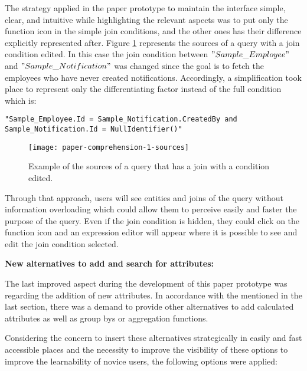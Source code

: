 The strategy applied in the paper prototype to maintain the interface simple, clear, and intuitive while highlighting the relevant aspects was to put only the function icon in the simple join conditions, and the other ones has their difference explicitly represented after. Figure \ref{fig:paperComprehension1Sources} represents the sources of a query with a join condition edited. In this case the join condition between $"Sample\_Employee"$ and $"Sample\_Notification"$ was changed since the goal is to fetch the employees who have never created notifications. Accordingly, a simplification took place to represent only the differentiating factor instead of the full condition which is:

\begin{center}
  \verb|"Sample_Employee.Id = Sample_Notification.CreatedBy and| 
  \\
  \verb|Sample_Notification.Id = NullIdentifier()"|
\end{center}

\begin{figure}[htbp]
	\centering
  \texttt{[image: paper-comprehension-1-sources]}
	\caption{Example of the sources of a query that has a join with a condition edited.}
	\label{fig:paperComprehension1Sources}
\end{figure}

Through that approach, users will see entities and joins of the query without information overloading which could allow them to perceive easily and faster the purpose of the query. Even if the join condition is hidden, they could click on the function icon and an expression editor will appear where it is possible to see and edit the join condition selected.

\medskip

\textbf{New alternatives to add and search for attributes:}

\medskip

The last improved aspect during the development of this paper prototype was regarding the addition of new attributes. In accordance with the mentioned in the last section, there was a demand to provide other alternatives to add calculated attributes as well as group bys or aggregation functions.

Considering the concern to insert these alternatives strategically in easily and fast accessible places and the necessity to improve the visibility of these options to improve the learnability of novice users, the following options were applied:

